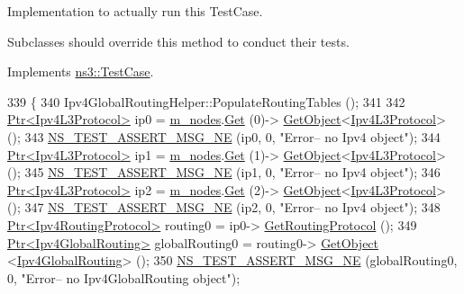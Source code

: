 Implementation to actually run this Test\+Case. 

Subclasses should override this method to conduct their tests. 

Implements \hyperlink{classns3_1_1TestCase_a8ff74680cf017ed42011e4be51917a24}{ns3\+::\+Test\+Case}.


\begin{DoxyCode}
339 \{
340   Ipv4GlobalRoutingHelper::PopulateRoutingTables ();
341 
342   \hyperlink{classns3_1_1Ptr}{Ptr<Ipv4L3Protocol>} ip0 = \hyperlink{classTwoLinkTest_a535eefa99c2bbfc3103efa335fd96d76}{m\_nodes}.\hyperlink{classns3_1_1NodeContainer_a9ed96e2ecc22e0f5a3d4842eb9bf90bf}{Get} (0)->
      \hyperlink{classns3_1_1Object_a13e18c00017096c8381eb651d5bd0783}{GetObject}<\hyperlink{classns3_1_1Ipv4L3Protocol}{Ipv4L3Protocol}> ();
343   \hyperlink{group__testing_ga73d66fb0050a5111453fd144e767b91a}{NS\_TEST\_ASSERT\_MSG\_NE} (ip0, 0, \textcolor{stringliteral}{"Error-- no Ipv4 object"});  
344   \hyperlink{classns3_1_1Ptr}{Ptr<Ipv4L3Protocol>} ip1 = \hyperlink{classTwoLinkTest_a535eefa99c2bbfc3103efa335fd96d76}{m\_nodes}.\hyperlink{classns3_1_1NodeContainer_a9ed96e2ecc22e0f5a3d4842eb9bf90bf}{Get} (1)->
      \hyperlink{classns3_1_1Object_a13e18c00017096c8381eb651d5bd0783}{GetObject}<\hyperlink{classns3_1_1Ipv4L3Protocol}{Ipv4L3Protocol}> ();
345   \hyperlink{group__testing_ga73d66fb0050a5111453fd144e767b91a}{NS\_TEST\_ASSERT\_MSG\_NE} (ip1, 0, \textcolor{stringliteral}{"Error-- no Ipv4 object"});  
346   \hyperlink{classns3_1_1Ptr}{Ptr<Ipv4L3Protocol>} ip2 = \hyperlink{classTwoLinkTest_a535eefa99c2bbfc3103efa335fd96d76}{m\_nodes}.\hyperlink{classns3_1_1NodeContainer_a9ed96e2ecc22e0f5a3d4842eb9bf90bf}{Get} (2)->
      \hyperlink{classns3_1_1Object_a13e18c00017096c8381eb651d5bd0783}{GetObject}<\hyperlink{classns3_1_1Ipv4L3Protocol}{Ipv4L3Protocol}> ();
347   \hyperlink{group__testing_ga73d66fb0050a5111453fd144e767b91a}{NS\_TEST\_ASSERT\_MSG\_NE} (ip2, 0, \textcolor{stringliteral}{"Error-- no Ipv4 object"});  
348   \hyperlink{classns3_1_1Ptr}{Ptr<Ipv4RoutingProtocol>} routing0 = ip0->
      \hyperlink{classns3_1_1Ipv4L3Protocol_aa1e4efbf4978299e47406895c3f4b41d}{GetRoutingProtocol} ();
349   \hyperlink{classns3_1_1Ptr}{Ptr<Ipv4GlobalRouting>} globalRouting0 = routing0->
      \hyperlink{classns3_1_1Object_a13e18c00017096c8381eb651d5bd0783}{GetObject} <\hyperlink{classns3_1_1Ipv4GlobalRouting}{Ipv4GlobalRouting}> ();
350   \hyperlink{group__testing_ga73d66fb0050a5111453fd144e767b91a}{NS\_TEST\_ASSERT\_MSG\_NE} (globalRouting0, 0, \textcolor{stringliteral}{"Error-- no Ipv4GlobalRouting object"});  

\end{DoxyCode}
